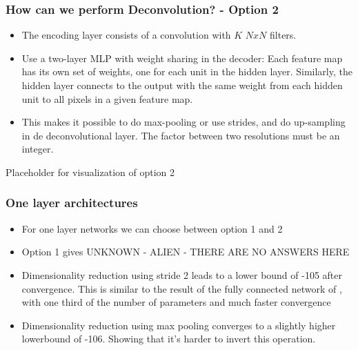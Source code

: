 \documentclass{beamer}
\begin{document}
\begin{frame}
\frametitle{How can we perform Deconvolution? - Option 2}

\begin{itemize}
\item The encoding layer consists of a convolution with $K$ $NxN$ filters.
\item Use a two-layer MLP with weight sharing in the decoder: Each feature map has its own set of weights, one for each unit in the hidden layer. Similarly, the hidden layer connects to the output with the same weight from each hidden unit to all pixels in a given feature map.
\item This makes it possible to do max-pooling or use strides, and do up-sampling in de deconvolutional layer. The factor between two resolutions must be an integer.
\end{itemize}



\end{frame}

\begin{frame}
Placeholder for visualization of option 2
\end{frame}

\begin{frame}
\frametitle{One layer architectures}

\begin{itemize}
	\item For one layer networks we can choose between option 1 and 2
	\item Option 1 gives UNKNOWN - ALIEN - THERE ARE NO ANSWERS HERE
	\item Dimensionality reduction using stride 2 leads to a lower bound of -105 after convergence. This is similar to the result of the fully connected network of \cite{kingma2013stochastic}, with one third of the number of parameters and much faster convergence
	\item Dimensionality reduction using max pooling converges to a slightly higher lowerbound of -106. Showing that it's  harder to invert this operation.
	\end{itemize}
\end{frame}
\end{document}
